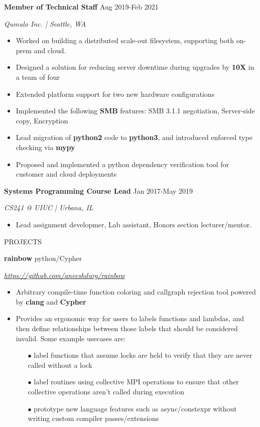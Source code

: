 \documentclass[paper=a4,fontsize=11pt]{scrartcl} %
\newcommand{\NewPart}[1]{ \noindent \large \usefont{OT1}{phv}{b}{n}\uppercase{#1} \normalfont \normalsize}
\newcommand{\EducationEntry}[4]{
		\noindent \textbf{#1}     %
			\hfill#2 \par  %
		\noindent \textit{#3} \par        %
		\noindent\hangafter=0 \small #4 %
		\normalsize \par}
\begin{document}
\EducationEntry{Member of Technical Staff}{Aug 2019-Feb 2021}{Qumulo Inc. | Seattle, WA}{
\begin{itemize}
  \item Worked on building a distributed scale-out filesystem, supporting both on-prem and cloud.
  \item Designed a solution for reducing server downtime during upgrades by \textbf{10X} in a team of four
  \item Extended platform support for two new hardware configurations
  \item Implemented the following \textbf{SMB} features: SMB 3.1.1 negotiation, Server-side copy, Encryption
  \item Lead migration of \textbf{python2} code to \textbf{python3}, and introduced enforced type checking via \textbf{mypy}
  \item Proposed and implemented a python dependency verification tool for customer and cloud deployments
\end{itemize}
}

\EducationEntry{Systems Programming Course Lead}{Jan 2017-May 2019}{CS241 @ UIUC | Urbana, IL}{
\begin{itemize}
  \item Lead assignment developmer, Lab assistant, Honors section lecturer/mentor.
\end{itemize}
}

\vspace{0.75em}
\NewPart{Projects}{}

\EducationEntry{rainbow}{python/Cypher}{\url{https://github.com/aneeshdurg/rainbow}}{
\begin{itemize}
  \item Arbitrary compile-time function coloring and callgraph rejection tool powered by \textbf{clang} and \textbf{Cypher}
\item Provides an ergonomic way for users to labels functions and lambdas, and then define relationships between those labels that should be considered invalid. Some example usecases are:
  \begin{itemize}
    \item[$\bullet$] label functions that assume locks are held to verify that they are never called without a lock
    \item[$\bullet$] label routines using collective MPI operations to ensure that other collective operations aren't called during execution
    \item[$\bullet$] prototype new language features such as async/constexpr without writing custom compiler passes/extensions
  \end{itemize}
\end{itemize}
}
\end{document}
